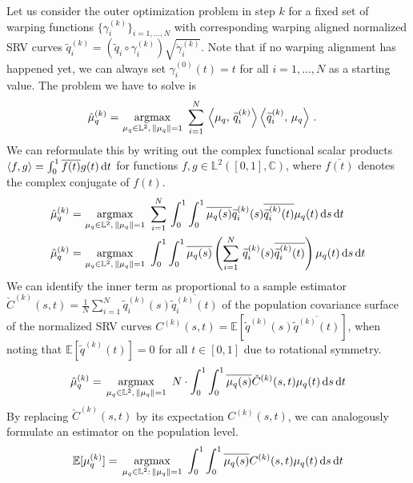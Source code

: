 Let us consider the outer optimization problem in step $k$ for a fixed set of warping functions $\{\gamma_i^{(k)}\}_{i=1,\dots,N}$ with corresponding warping aligned normalized SRV curves $\widetilde q_i^{(k)} = ( \widetilde q_i \circ \gamma_i^{(k)}) \sqrt{\dot\gamma_i^{(k)}}$.
Note that if no warping alignment has happened yet, we can always set $\gamma_i^{(0)}(t) = t$ for all $i=1,\dots,N$ as a starting value.
The problem we have to solve is
\begin{align}
  \hat\mu_q^{(k)} = &\, \operatorname*{argmax}_{\mu_q \in \mathbb{L}^2,\,\lVert\mu_q\rVert = 1}\,\,
    \sum_{i=1}^N \, \left\langle \mu_q,\, \widetilde q_i^{(k)} \right\rangle \left\langle \widetilde q_i^{(k)},\, \mu_q \right\rangle\,.
\end{align}
We can reformulate this by writing out the complex functional scalar products $\langle f, g \rangle = \int_0^1 \overline{f(t)} g(t) \mathop{\mathrm{d}t}$ for functions $f,g \in \mathbb{L}^2([0,1], \mathbb{C})$, where $\overline{f(t)}$ denotes the complex conjugate of $f(t)$.
\begin{align}
  \hat\mu_q^{(k)} = &\, \operatorname*{argmax}_{\mu_q \in \mathbb{L}^2,\,\lVert\mu_q\rVert = 1}\,\,
    \sum_{i=1}^N \, \int_0^1 \int_0^1 \overline{\mu_q (s)} \widetilde q_i^{(k)}(s) \overline{\widetilde q_i^{(k)}(t)} \mu_q(t) \mathop{\mathrm{d}s}\mathop{\mathrm{d}t} \\
  \hat\mu_q^{(k)} = &\, \operatorname*{argmax}_{\mu_q \in \mathbb{L}^2,\,\lVert\mu_q\rVert = 1}\,\,
    \int_0^1 \int_0^1 \overline{\mu_q (s)} \left( \sum_{i=1}^N\, \widetilde q_i^{(k)}(s) \overline{ \widetilde q_i^{(k)}(t)} \right) \mu_q(t) \mathop{\mathrm{d}s}\mathop{\mathrm{d}t}
\end{align}
We can identify the inner term as proportional to a sample estimator $\check{C}^{(k)}(s,t) = \frac{1}{N} \sum_{i=1}^N \widetilde q_i^{(k)}(s) \overline{\widetilde q_i^{(k)}(t)}$ of the population covariance surface of the normalized SRV curves $C^{(k)}(s,t) = \mathbb{E}[\widetilde q^{(k)}(s) \overline{\widetilde q^{(k)}(t)}]$, when noting that $\mathbb{E}[\widetilde q^{(k)}(t)] = 0$ for all $t \in [0,1]$ due to rotational symmetry.
\begin{equation}
\hat\mu_q^{(k)} = \, \operatorname*{argmax}_{\mu_q \in \mathbb{L}^2,\,\lVert\mu_q\rVert = 1}\,\,
    N\cdot\int_0^1 \int_0^1 \overline{\mu_q (s)} \check C^{(k)}(s,t) \mu_q(t) \mathop{\mathrm{d}s}\mathop{\mathrm{d}t}
\end{equation}
By replacing $\check C^{(k)}(s,t)$ by its expectation $C^{(k)}(s,t)$, we can analogously formulate an estimator on the population level.
\begin{equation}
  \mathbb{E}[\mu_q^{(k)}] = \, \operatorname*{argmax}_{\mu_q \in \mathbb{L}^2:\,\lVert\mu_q\rVert = 1}\,\,
    \int_0^1 \int_0^1 \overline{\mu_q (s)} C^{(k)}(s,t) \mu_q(t) \mathop{\mathrm{d}s}\mathop{\mathrm{d}t}
\end{equation}
